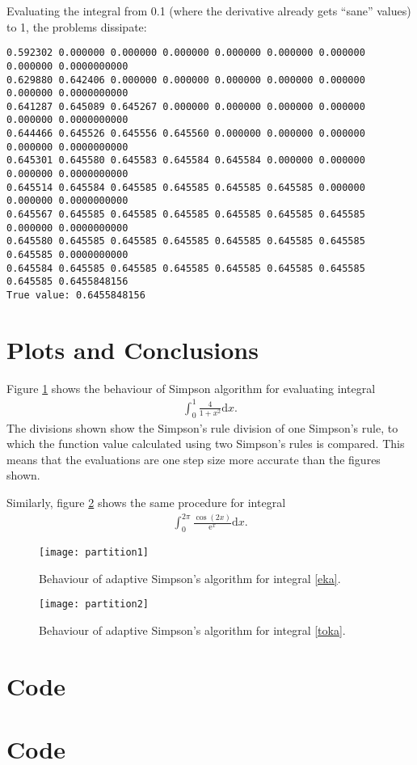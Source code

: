 \documentclass[a4paper,12pt]{scrartcl}
\begin{document}
\noindent Evaluating the integral from 0.1 (where the derivative already
gets ``sane'' values) to 1, the problems dissipate:
\begin{verbatim}
0.592302 0.000000 0.000000 0.000000 0.000000 0.000000 0.000000 0.000000 0.0000000000
0.629880 0.642406 0.000000 0.000000 0.000000 0.000000 0.000000 0.000000 0.0000000000
0.641287 0.645089 0.645267 0.000000 0.000000 0.000000 0.000000 0.000000 0.0000000000
0.644466 0.645526 0.645556 0.645560 0.000000 0.000000 0.000000 0.000000 0.0000000000
0.645301 0.645580 0.645583 0.645584 0.645584 0.000000 0.000000 0.000000 0.0000000000
0.645514 0.645584 0.645585 0.645585 0.645585 0.645585 0.000000 0.000000 0.0000000000
0.645567 0.645585 0.645585 0.645585 0.645585 0.645585 0.645585 0.000000 0.0000000000
0.645580 0.645585 0.645585 0.645585 0.645585 0.645585 0.645585 0.645585 0.0000000000
0.645584 0.645585 0.645585 0.645585 0.645585 0.645585 0.645585 0.645585 0.6455848156
True value: 0.6455848156
\end{verbatim}
\clearpage
\section{Plots and Conclusions}
Figure \ref{fig:partition1} shows the behaviour of Simpson algorithm for
evaluating integral
\begin{align}\label{eka}
    \int_0^1\frac{4}{1+x^2}\mathrm{d}x.
\end{align}
The divisions shown show the Simpson's rule division of one Simpson's rule,
to which the function value calculated using two Simpson's rules is
compared. This means that the evaluations are one step size more accurate
than the figures shown.

Similarly, figure \ref{fig:partition2} shows the same procedure for integral
\begin{align}\label{toka}
    \int_0^{2\pi}\frac{\cos(2x)}{\mathrm{e}^x}\mathrm{d}x.
\end{align}
\begin{figure}[h!]
  \centering
    \texttt{[image: partition1]}
\caption{Behaviour of adaptive Simpson's algorithm for integral \ref{eka}.}
  \label{fig:partition1}
\end{figure}
\clearpage
\begin{figure}[h!]
  \centering
    \texttt{[image: partition2]}
\caption{Behaviour of adaptive Simpson's algorithm for integral \ref{toka}.}
  \label{fig:partition2}
\end{figure}
\clearpage
\appendix
\lstset{basicstyle=\ttfamily, numbers=left, numberstyle=\tiny, stepnumber=1, numbersep=5pt}
\gdef\thesection{Appendix \arabic{section}.}
\clearpage

\section{Code\label{LiiteA}}

\clearpage
\section{Code\label{LiiteB}}

\end{document}
